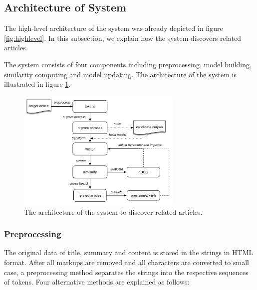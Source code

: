 \begin{description}
\label{tab:def_terms}
\end{description}


\subsection{Architecture of System}
\label{sec:4.3}

The high-level architecture of the system was already depicted in figure \ref{fig:highlevel}. In this subsection, we explain how the system discovers related articles. 

The system consists of four components including preprocessing, model building, similarity computing and model updating. The architecture of the system is illustrated in figure \ref{fig:unsupervised}. 

\begin{figure}[!htb]
    \centering
    \includegraphics[width=0.7\textwidth]{fig/unsupervise}
    \caption{The architecture of the system to discover related articles.}
    \label{fig:unsupervised}
\end{figure}

\subsubsection{Preprocessing}
The original data of title, summary and content is stored in the strings in HTML format. After all markups are removed and all characters are converted to small case, a preprocessing method separates the strings into the respective sequences of tokens. Four alternative methods are explained as follows:

